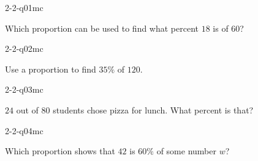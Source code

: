 

\begin{practiceQuestion}{2-2-q01}{mc}
\begin{questionText}
Which proportion can be used to find what percent $18$ is of $60$?
\end{questionText}
\end{practiceQuestion}

\begin{practiceQuestion}{2-2-q02}{mc}
\begin{questionText}
Use a proportion to find $35\%$ of $120$.
\end{questionText}
\end{practiceQuestion}

\begin{practiceQuestion}{2-2-q03}{mc}
\begin{questionText}
$24$ out of $80$ students chose pizza for lunch. What percent is that?
\end{questionText}
\end{practiceQuestion}

\begin{practiceQuestion}{2-2-q04}{mc}
\begin{questionText}
Which proportion shows that $42$ is $60\%$ of some number $w$?
\end{questionText}
\end{practiceQuestion}

